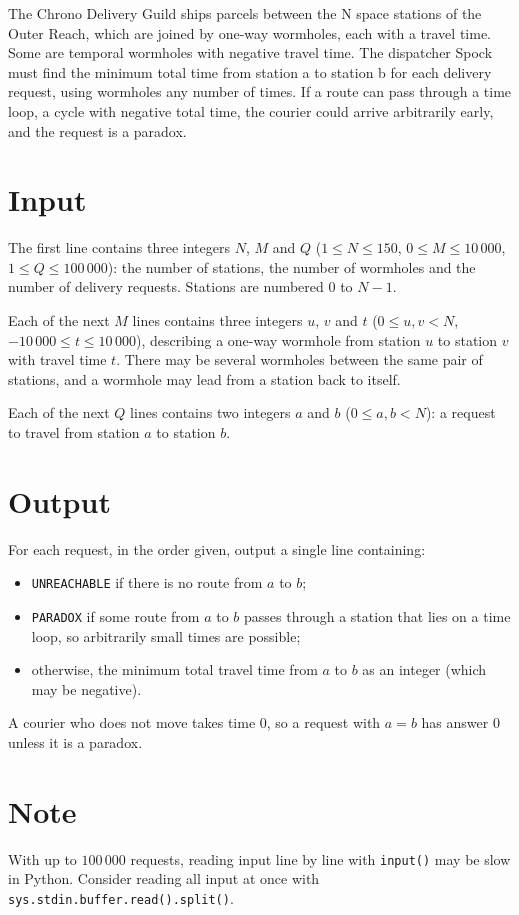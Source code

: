 
The Chrono Delivery Guild ships parcels between the N space stations of the Outer Reach, which
are joined by one-way wormholes, each with a travel time. Some are temporal wormholes with
negative travel time. The dispatcher Spock must find the minimum total time from station a to
station b for each delivery request, using wormholes any number of times. If a route can pass
through a time loop, a cycle with negative total time, the courier could arrive arbitrarily early, and
the request is a paradox.

\section*{Input}
The first line contains three integers $N$, $M$ and $Q$
($1 \le N \le 150$, $0 \le M \le 10\,000$, $1 \le Q \le 100\,000$): the
number of stations, the number of wormholes and the number of delivery
requests. Stations are numbered $0$ to $N-1$.

Each of the next $M$ lines contains three integers $u$, $v$ and $t$
($0 \le u, v < N$, $-10\,000 \le t \le 10\,000$), describing a one-way
wormhole from station $u$ to station $v$ with travel time $t$. There may be
several wormholes between the same pair of stations, and a wormhole may lead
from a station back to itself.

Each of the next $Q$ lines contains two integers $a$ and $b$
($0 \le a, b < N$): a request to travel from station $a$ to station $b$.

\section*{Output}
For each request, in the order given, output a single line containing:
\begin{itemize}
  \item \texttt{UNREACHABLE} if there is no route from $a$ to $b$;
  \item \texttt{PARADOX} if some route from $a$ to $b$ passes through a
        station that lies on a time loop, so arbitrarily small times are
        possible;
  \item otherwise, the minimum total travel time from $a$ to $b$ as an
        integer (which may be negative).
\end{itemize}
A courier who does not move takes time $0$, so a request with $a = b$ has
answer $0$ unless it is a paradox.

\section*{Note}
With up to $100\,000$ requests, reading input line by line with
\texttt{input()} may be slow in Python. Consider reading all input at once
with \texttt{sys.stdin.buffer.read().split()}.
